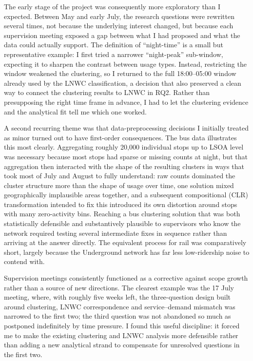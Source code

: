 The early stage of the project was consequently more exploratory than I expected. Between May and early July, the research questions were rewritten several times, not because the underlying interest changed, but because each supervision meeting exposed a gap between what I had proposed and what the data could actually support. The definition of ``night-time'' is a small but representative example: I first tried a narrower ``night-peak'' sub-window, expecting it to sharpen the contrast between usage types. Instead, restricting the window weakened the clustering, so I returned to the full 18:00--05:00 window already used by the LNWC classification, a decision that also preserved a clean way to connect the clustering results to LNWC in RQ2. Rather than presupposing the right time frame in advance, I had to let the clustering evidence and the analytical fit tell me which one worked.

A second recurring theme was that data-preprocessing decisions I initially treated as minor turned out to have first-order consequences. The bus data illustrates this most clearly. Aggregating roughly 20,000 individual stops up to LSOA level was necessary because most stops had sparse or missing counts at night, but that aggregation then interacted with the shape of the resulting clusters in ways that took most of July and August to fully understand: raw counts dominated the cluster structure more than the shape of usage over time, one solution mixed geographically implausible areas together, and a subsequent compositional (CLR) transformation intended to fix this introduced its own distortion around stops with many zero-activity bins. Reaching a bus clustering solution that was both statistically defensible and substantively plausible to supervisors who know the network required testing several intermediate fixes in sequence rather than arriving at the answer directly. The equivalent process for rail was comparatively short, largely because the Underground network has far less low-ridership noise to contend with.

Supervision meetings consistently functioned as a corrective against scope growth rather than a source of new directions. The clearest example was the 17 July meeting, where, with roughly five weeks left, the three-question design built around clustering, LNWC correspondence and service--demand mismatch was narrowed to the first two; the third question was not abandoned so much as postponed indefinitely by time pressure. I found this useful discipline: it forced me to make the existing clustering and LNWC analysis more defensible rather than adding a new analytical strand to compensate for unresolved questions in the first two.

